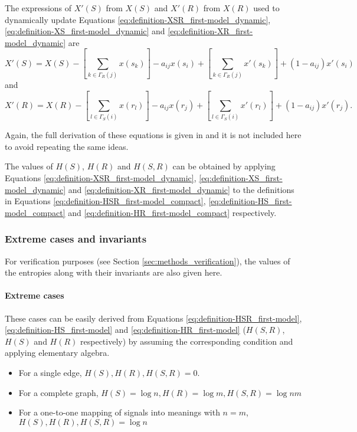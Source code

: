 The expressions of $X'(S)$ from $X(S)$ and $X'(R)$ from $X(R)$ used to dynamically update Equations \eqref{eq:definition-XSR_first-model_dynamic}, \eqref{eq:definition-XS_first-model_dynamic} and \eqref{eq:definition-XR_first-model_dynamic} are
\begin{equation}
  \label{eq:definition-XS_first-model_dynamic}
  X'(S) = X(S) - \left[ \sum_{k \in \Gamma_{R}(j)} x(s_k) \right] - a_{ij} x(s_i) + \left[ \sum_{k \in \Gamma_{R}(j)} x'(s_k) \right] + (1 - a_{ij}) x'(s_i)
\end{equation}
and
\begin{equation}
  \label{eq:definition-XR_first-model_dynamic}
  X'(R) = X(R) - \left[ \sum_{l \in \Gamma_{S}(i)} x(r_l) \right] - a_{ij} x(r_j) + \left[ \sum_{l \in \Gamma_{S}(i)} x'(r_l) \right] + (1 - a_{ij}) x'(r_j).
\end{equation}

Again, the full derivation of these equations is given in \cite{Carrera2021a} and it is not included here to avoid repeating the same ideas.

The values of $H(S)$, $H(R)$ and $H(S,R)$ can be obtained by applying Equations \eqref{eq:definition-XSR_first-model_dynamic}, \eqref{eq:definition-XS_first-model_dynamic} and \eqref{eq:definition-XR_first-model_dynamic} to the definitions in Equations \eqref{eq:definition-HSR_first-model_compact}, \eqref{eq:definition-HS_first-model_compact} and \eqref{eq:definition-HR_first-model_compact} respectively.

\subsubsection{Extreme cases and invariants}
\label{sec:model_math_first-model_invariant}

For verification purposes (see Section \ref{sec:methods_verification}), the values of the entropies along with their invariants are also given here.

\paragraph{Extreme cases} These cases can be easily derived from Equations \eqref{eq:definition-HSR_first-model}, \eqref{eq:definition-HS_first-model} and \eqref{eq:definition-HR_first-model} ($H(S,R)$, $H(S)$ and $H(R)$ respectively) by assuming the corresponding condition and applying elementary algebra.

\begin{itemize}
\item For a single edge, $H(S), H(R), H(S,R) = 0$.
\item For a complete graph, $H(S) = \log n, H(R) = \log m, H(S,R) = \log nm $
\item For a one-to-one mapping of signals into meanings with $n=m$, $H(S), H(R), H(S,R) = \log n$
\end{itemize}

